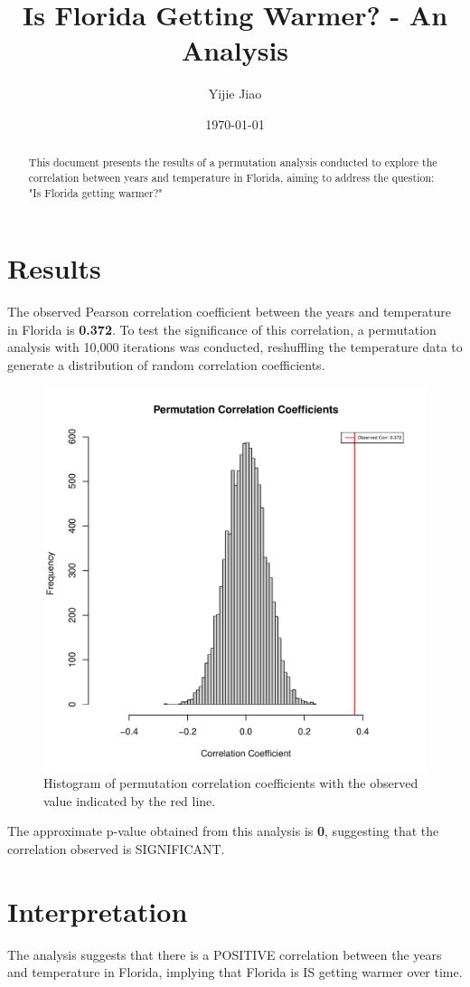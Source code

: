 \documentclass[a4paper,12pt]{article}
\begin{document}
\title{Is Florida Getting Warmer? - An Analysis}
\author{Yijie Jiao}
\date{\today}
\maketitle

\begin{abstract}
This document presents the results of a permutation analysis conducted to explore the correlation between years and temperature in Florida, aiming to address the question: "Is Florida getting warmer?"
\end{abstract}

\section*{Results}
The observed Pearson correlation coefficient between the years and temperature in Florida is \textbf{0.372}. To test the significance of this correlation, a permutation analysis with 10,000 iterations was conducted, reshuffling the temperature data to generate a distribution of random correlation coefficients.

\begin{figure}[H]
    \centering
    \includegraphics[width=\textwidth]{correlation_histogram.pdf} %
    \caption{Histogram of permutation correlation coefficients with the observed value indicated by the red line.}
\end{figure}

The approximate p-value obtained from this analysis is \textbf{0}, suggesting that the correlation observed is SIGNIFICANT.

\section*{Interpretation}
The analysis suggests that there is a POSITIVE correlation between the years and temperature in Florida, implying that Florida is IS getting warmer over time.
\end{document}
